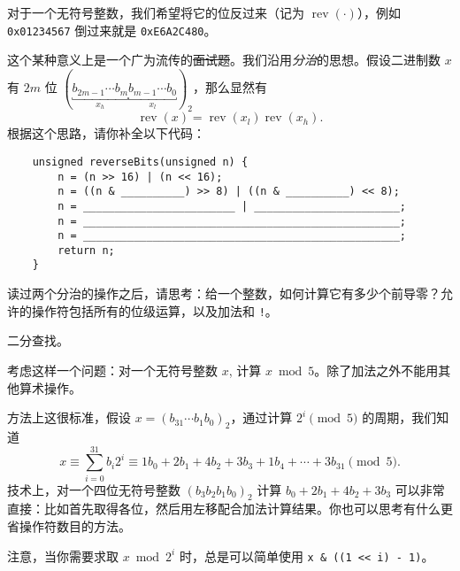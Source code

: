     \begin{example}[模拟操作 2]
        对于一个无符号整数，我们希望将它的位反过来（记为 $\operatorname{rev}(\cdot)$），例如 \texttt{0x01234567} 倒过来就是 \texttt{0xE6A2C480}。

        这个某种意义上是一个广为流传的\sout{面试题}。我们沿用\emph{分治}的思想。假设二进制数 $x$ 有 $2m$ 位 $(\underbracket{b_{2m-1} \dotsm b_m}_{x_h} \underbracket{b_{m-1} \dotsm b_0}_{x_l})_2$，那么显然有
        \[ \operatorname{rev}(x) = \operatorname{rev}(x_l) \operatorname{rev}(x_h). \]
        根据这个思路，请你补全以下代码：
        \begin{verbatim}
    unsigned reverseBits(unsigned n) {
        n = (n >> 16) | (n << 16);
        n = ((n & __________) >> 8) | ((n & __________) << 8);
        n = ________________________ | _______________________;
        n = __________________________________________________;
        n = __________________________________________________;
        return n;
    }
        \end{verbatim}

        读过两个分治的操作之后，请思考：给一个整数，如何计算它有多少个前导零？允许的操作符包括所有的位级运算，以及加法和 \texttt{!}。\begin{hint} 二分查找。 \end{hint}
    \end{example}

    \begin{example}[算术运算]
        考虑这样一个问题：对一个无符号整数 $x$, 计算 $x \bmod 5$。除了加法之外不能用其他算术操作。

        方法上这很标准，假设 $x=(b_{31} \dotsm b_1b_0)_2$，通过计算 $2^i \pmod 5$ 的周期，我们知道
        \[ x \equiv \sum_{i=0}^{31} b_i2^i \equiv 1b_0+2b_1+4b_2+3b_3+1b_4 + \dotsb + 3b_{31} \pmod 5. \]
        技术上，对一个四位无符号整数 $(b_3b_2b_1b_0)_2$ 计算 $b_0+2b_1+4b_2+3b_3$ 可以非常直接：比如首先取得各位，然后用左移配合加法计算结果。你也可以思考有什么更省操作符数目的方法。

        注意，当你需要求取 $x \bmod 2^i$ 时，总是可以简单使用 \verb|x & ((1 << i) - 1)|。
    \end{example}

